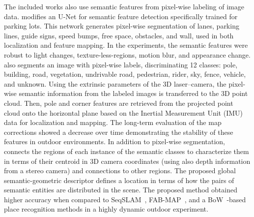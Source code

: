 The included works also use semantic features from pixel-wise labeling of image data.
\cite{qin-et-al:2020:9340939} modifies an U-Net for semantic feature detection specifically trained for parking lots. This network generates pixel-wise segmentation of lanes, parking lines, guide signs, speed bumps, free space, obstacles, and wall, used in both localization and feature mapping. In the experiments, the semantic features were robust to light changes, texture-less-regions, motion blur, and appearance change.
\cite{berrio-et-al:2021:3094485} also segments an image with pixel-wise labels, discriminating 12 classes: pole, building, road, vegetation, undrivable road, pedestrian, rider, sky, fence, vehicle, and unknown. Using the extrinsic parameters of the 3D laser--camera, the pixel-wise semantic information from the labeled images is transferred to the 3D point cloud. Then, pole and corner features are retrieved from the projected point cloud onto the horizontal plane based on the Inertial Measurement Unit (IMU) data for localization and mapping. The long-term evaluation of the map corrections showed a decrease over time demonstrating the stability of these features in outdoor environments.
In addition to pixel-wise segmentation, \cite{singh-et-al:2021:9564866} connects the regions of each instance of the semantic classes to characterize them in terms of their centroid in 3D camera coordinates (using also depth information from a stereo camera) and connections to other regions. The proposed global semantic-geometric descriptor defines a location in terms of how the pairs of semantic entities are distributed in the scene. The proposed method obtained higher accuracy when compared to SeqSLAM~\parencite{discussion:seqslam}, FAB-MAP~\parencite{discussion:fab-map}, and a BoW~\parencite{discussion:bow}-based place recognition methods in a highly dynamic outdoor experiment.

